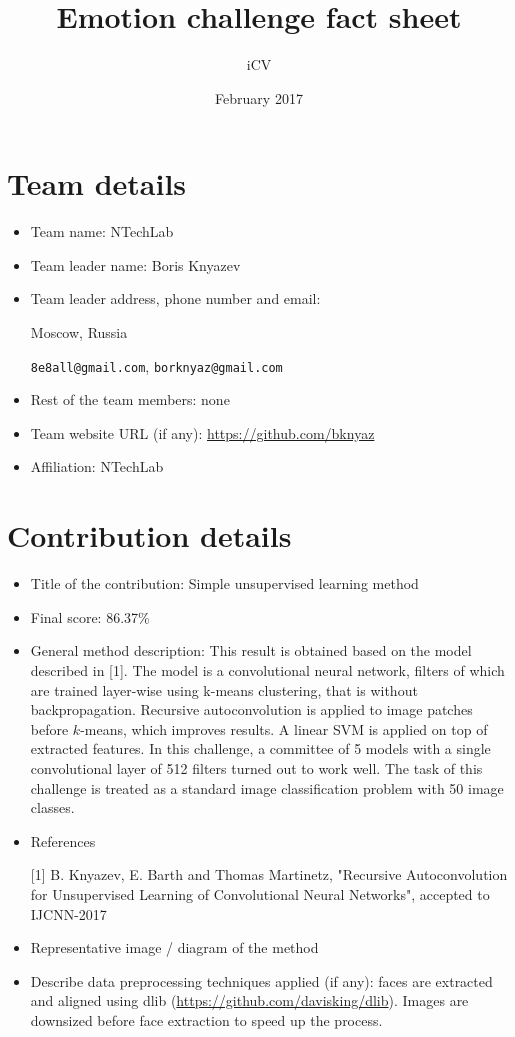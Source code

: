\documentclass{article}
\title{Emotion challenge fact sheet}
\author{iCV}
\date{February 2017}
\begin{document}
\maketitle

\section{Team details}

\begin{itemize}
\item Team name: NTechLab                                  
\item Team leader name: Boris Knyazev                           
\item Team leader address, phone number and email: 

Moscow, Russia

\texttt{8e8all@gmail.com}, \texttt{borknyaz@gmail.com}

\item Rest of the team members: none                    
\item Team website URL (if any): \url{https://github.com/bknyaz}
\item Affiliation: NTechLab
\end{itemize}

\section{Contribution details}

\begin{itemize}
\item Title of the contribution: Simple unsupervised learning method
\item Final score: 86.37\%                                              
\item General method description: This result is obtained based on the model described in [1]. 
The model is a convolutional neural network, filters of which are trained layer-wise using k-means clustering, that is without backpropagation. 
Recursive autoconvolution is applied to image patches before $k$-means, which improves results. 
A linear SVM is applied on top of extracted features. In this challenge, a committee of 5 models with a single convolutional layer of 512 filters turned out to work well.
The task of this challenge is treated as a standard image classification problem with 50 image classes.

\item References

[1] B. Knyazev, E. Barth and Thomas Martinetz, "Recursive Autoconvolution for Unsupervised Learning of Convolutional Neural Networks", accepted to IJCNN-2017
\item Representative image / diagram of the method        
\item Describe data preprocessing techniques applied (if any): 
faces are extracted and aligned using dlib (\url{https://github.com/davisking/dlib}). 
Images are downsized before face extraction to speed up the process.
\end{itemize}
\end{document}
